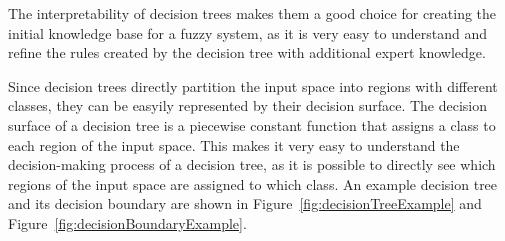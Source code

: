 The interpretability of decision trees makes them a good choice for creating the initial knowledge base for a fuzzy system, as it is very easy to understand and refine the rules created by the decision tree with additional expert knowledge.

Since decision trees directly partition the input space into regions with different classes, they can be easyily represented by their decision surface. The decision surface of a decision tree is a piecewise constant function that assigns a class to each region of the input space. This makes it very easy to understand the decision-making process of a decision tree, as it is possible to directly see which regions of the input space are assigned to which class. An example decision tree and its decision boundary are shown in Figure~\ref{fig:decisionTreeExample} and Figure~\ref{fig:decisionBoundaryExample}.

